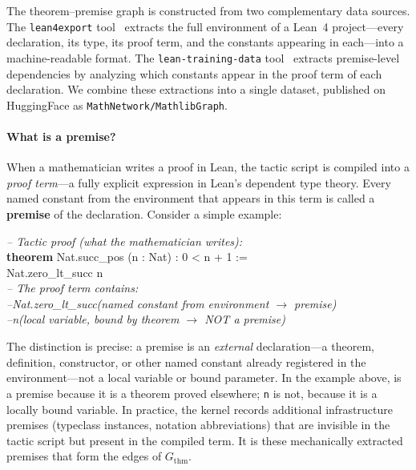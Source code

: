 The theorem--premise graph is constructed from two complementary data sources. The \texttt{lean4export} tool~\cite{lean4export} extracts the full environment of a Lean~4 project---every declaration, its type, its proof term, and the constants appearing in each---into a machine-readable format. The \texttt{lean-training-data} tool~\cite{lean_training_data} extracts premise-level dependencies by analyzing which constants appear in the proof term of each declaration. We combine these extractions into a single dataset, published on HuggingFace as \texttt{MathNetwork/MathlibGraph}.
\paragraph{What is a premise?}
When a mathematician writes a proof in Lean, the tactic script is compiled into a \emph{proof term}---a fully explicit expression in Lean's dependent type theory. Every named constant from the environment that appears in this term is called a \textbf{premise} of the declaration. Consider a simple example:

\begin{codebox}
\textit{\color{gray}-- Tactic proof (what the mathematician writes):}\\
\textbf{theorem} \textcolor{red!70!black}{Nat.succ\_pos} (n : Nat) : 0 < n + 1 :=\\
\hspace{1.5em}\textcolor{red!70!black}{Nat.zero\_lt\_succ} n\\[3pt]
\textit{\color{gray}-- The proof term contains:}\\
\textit{\color{gray}--\hspace{0.5em}Nat.zero\_lt\_succ\hspace{1em}(named constant from environment $\to$ premise)}\\
\textit{\color{gray}--\hspace{0.5em}n\hspace{6.3em}(local variable, bound by theorem $\to$ NOT a premise)}
\end{codebox}

\noindent
The distinction is precise: a premise is an \emph{external} declaration---a theorem, definition, constructor, or other named constant already registered in the environment---not a local variable or bound parameter. In the example above,  is a premise because it is a theorem proved elsewhere; \texttt{n} is not, because it is a locally bound variable. In practice, the kernel records additional infrastructure premises (typeclass instances, notation abbreviations) that are invisible in the tactic script but present in the compiled term. It is these mechanically extracted premises that form the edges of $G_{\mathrm{thm}}$.

